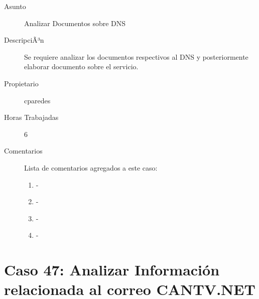 \begin{description}

\item[Asunto] Analizar Documentos sobre DNS\item[DescripciÃ³n] Se requiere analizar los documentos respectivos al DNS y posteriormente
elaborar documento sobre el servicio.\item[Propietario] cparedes\item[Horas Trabajadas] 6

\item[Comentarios] Lista de comentarios agregados a este caso:  
\begin{enumerate}
        \item {\bfseries  } - {\bfseries } \\         \item {\bfseries  } - {\bfseries } \\         \item {\bfseries  } - {\bfseries } \\         \item {\bfseries  } - {\bfseries } \\     \end{enumerate}

\end{description}

\section{Caso 47: Analizar Información relacionada al correo CANTV.NET }

